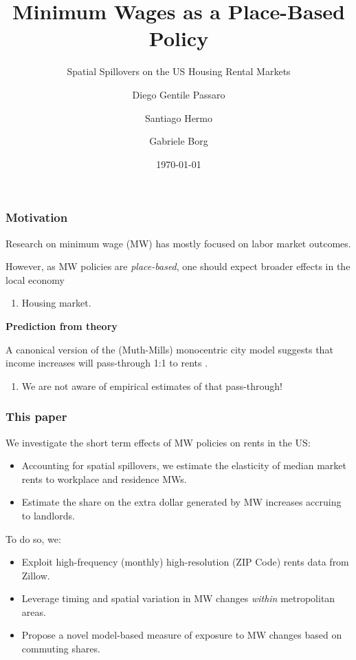 \documentclass[aspectratio=169, t]{beamer}
\title{Minimum Wages as a Place-Based Policy}
\subtitle{Spatial Spillovers on the US Housing Rental Markets}
\date{\today}
\author{Diego Gentile Passaro \and Santiago Hermo \and Gabriele Borg}
\institute{Brown University $ \quad\quad\quad\quad $ Brown University $ \quad\quad\quad\quad$  AWS}
\begin{document}
\maketitle



\begin{frame}
	\frametitle{Motivation}
	
	Research on minimum wage (MW) has mostly focused on labor market outcomes.
	
	\vspace{1.5mm}

	However, as MW policies are \textit{place-based}, one should expect broader effects 
	in the local economy
	\begin{enumerate}[$\Rightarrow $]
		\item Housing market.
	\end{enumerate}

	\pause
	\vspace{3mm}
	\textbf{Prediction from theory}
	
    A canonical version of the (Muth-Mills) monocentric city model suggests that income increases will 
    pass-through 1:1 to rents \parencite{Brueckner1987}.  
    \begin{enumerate}[$\Rightarrow $]
		\item We are not aware of empirical estimates of that pass-through!
	\end{enumerate}
\end{frame}

\begin{frame}
	\frametitle{This paper}
	We investigate the short term effects of MW policies on rents in the US:
	\begin{itemize}
		\vspace{.5mm} \item Accounting for spatial spillovers, we estimate 
		the elasticity of median market rents to workplace and residence MWs.
		\vspace{.5mm} \item Estimate the share on the extra dollar generated by
		MW increases accruing to landlords.
	\end{itemize}
	
	\vspace{3mm}
	\pause
	To do so, we:
	\begin{itemize}
    	\vspace{.5mm} \item Exploit high-frequency (monthly) high-resolution 
    	(ZIP Code) rents data from Zillow.
    	\vspace{.5mm} \item Leverage timing and spatial variation in MW changes 
    	\textit{within} metropolitan areas.
    	\vspace{.5mm} \item Propose a novel model-based measure of exposure to MW 
		changes based on commuting shares.
	\end{itemize}
\end{frame}
\end{document}
